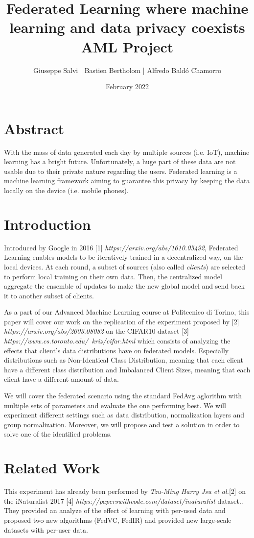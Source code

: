 \documentclass[twocolumn]{article}
\title{Federated Learning where machine learning and data privacy coexists
\\AML Project}
\author{Giuseppe Salvi |
Bastien Bertholom |
Alfredo Baldó Chamorro}
\date{February 2022}
\begin{document}
\maketitle

\section{Abstract}
With the mass of data generated each day by multiple sources (i.e. IoT), machine learning has a bright future. Unfortunately, a huge part of these data are not usable due to their private nature regarding the users. Federated learning is a machine learning framework aiming to guarantee this privacy by keeping the data locally on the device (i.e. mobile phones).
\section{Introduction} %

Introduced by Google in 2016 [1] \emph{https://arxiv.org/abs/1610.05492}, Federated Learning enables models to be iteratively trained in a decentralized way, on the local devices. At each round, a subset of sources (also called \emph{clients}) are selected to perform local training on their own data. Then, the centralized model aggregate the ensemble of updates to make the new global model and send back it to another subset of clients. 

As a part of our Advanced Machine Learning course at Politecnico di Torino, this paper will cover our work on the replication of the experiment proposed by [2] \emph{https://arxiv.org/abs/2003.08082} on the CIFAR10 dataset [3] \emph{https://www.cs.toronto.edu/~kriz/cifar.html} which consists of analyzing the effects that client's data distributions have on federated models. Especially distributions such as Non-Identical Class Distribution, meaning that each client have a different class distribution and Imbalanced Client Sizes, meaning that each client have a different amount of data. 

We will cover the federated scenario using the standard FedAvg aglorithm with multiple sets of parameters and evaluate the one performing best. We will experiment different settings such as data distribution, normalization layers and group normalization. Moreover, we will propose and test a solution in order to solve one of the identified problems.

\section{Related Work} %
This experiment has already been performed by \emph{Tzu-Ming Harry Jsu et al.}[2]  on the iNaturalist-2017 [4] \emph{https://paperswithcode.com/dataset/inaturalist} dataset.. They provided an analyze of the effect of learning with per-used data and proposed two new algorithms (FedVC, FedIR) and provided new large-scale datasets with per-user data.
\end{document}
